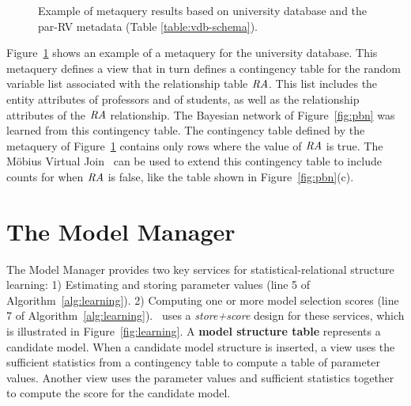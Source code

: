 \documentclass{IEEEtran}
\begin{document}
\begin{figure}[htb]
\begin{center}
\caption{Example of metaquery results based on university database and the par-RV metadata (Table \ref{table:vdb-schema}).
~\label{fig:meta-query}}
\end{center}
\end{figure}


Figure~\ref{fig:meta-query} shows an example of a metaquery for the university database. This metaquery defines a view that in turn defines a contingency table for the random variable list associated with the relationship table $\mathit{RA}$. This list includes the entity attributes of professors and of students, as well as the relationship attributes of the $\mathit{RA}$ relationship. 
The Bayesian network of Figure~\ref{fig:pbn} was learned from this contingency table. 
The  contingency table defined by the metaquery of Figure~\ref{fig:meta-query} contains only rows where the value of $\mathit{RA}$ is true. The M\"obius Virtual Join~\cite{Qian2014a} can be used to extend this contingency table to include counts for when $\mathit{RA}$ is false, like the table shown in Figure~\ref{fig:pbn}(c).

\section{The Model Manager}

The Model Manager provides two key services for statistical-relational structure learning: 1) Estimating and storing parameter values (line 5 of Algorithm~\ref{alg:learning}). 2) Computing one or more model selection scores (line 7 of Algorithm~\ref{alg:learning}).  \FB\ uses a {\em store+score} design for these services, which is illustrated in 
Figure~\ref{fig:learning}. 
A \textbf{model structure table} represents a candidate model. When a candidate model structure is inserted, a view uses the sufficient statistics from a contingency table to compute a table of parameter values. Another view uses the parameter values and sufficient statistics together to compute the score for the candidate model. 
\end{document}
